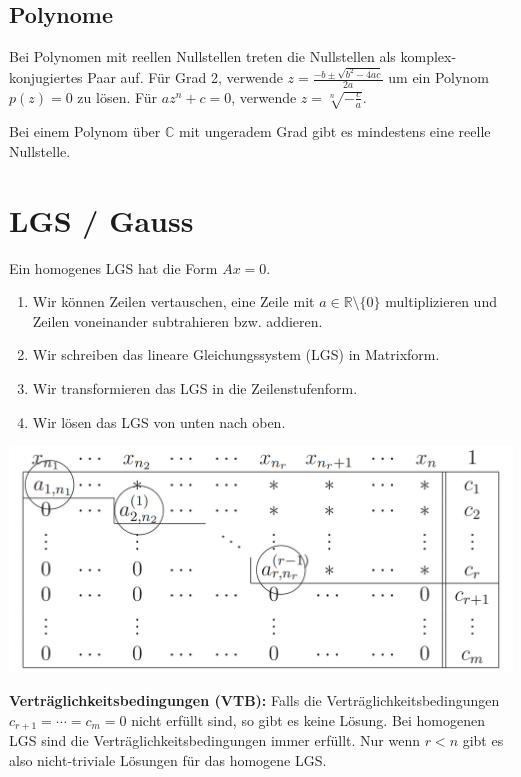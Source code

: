 \documentclass[a4paper,10pt]{article}
\begin{document}
\subsection{Polynome}

Bei Polynomen mit reellen Nullstellen treten die Nullstellen als komplex-konjugiertes Paar auf. Für Grad 2, verwende $z = \frac{-b \pm \sqrt{b^2 - 4ac}}{2a}$ um ein Polynom $p(z) = 0$ zu lösen. Für $a z^n + c = 0$, verwende $z = \sqrt[n]{-\frac{c}{a}}$.

Bei einem Polynom über $\mathbb{C}$ mit ungeradem Grad gibt es mindestens eine reelle Nullstelle.

\section{LGS / Gauss}

Ein homogenes LGS hat die Form $Ax = 0$.

\begin{enumerate}
  \item Wir können Zeilen vertauschen, eine Zeile mit $a \in \mathbb{R}\setminus \{0\}$ multiplizieren und Zeilen voneinander subtrahieren bzw. addieren.
  \item Wir schreiben das lineare Gleichungssystem (LGS) in Matrixform.
  \item Wir transformieren das LGS in die Zeilenstufenform.
  \item Wir lösen das LGS von unten nach oben.
\end{enumerate}

\begin{center}
  \includegraphics[width=0.8 \linewidth]{gauss.png}
\end{center}

\textbf{Verträglichkeitsbedingungen (VTB):} Falls die Verträglichkeitsbedingungen $c_{r+1} = \cdots = c_m = 0$ nicht erfüllt sind, so gibt es keine Lösung. Bei homogenen LGS sind die Verträglichkeitsbedingungen immer erfüllt. Nur wenn $r < n$ gibt es also nicht-triviale Lösungen für das homogene LGS.\\
\end{document}
